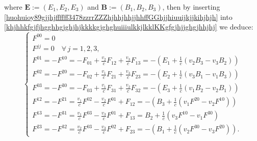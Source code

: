 \documentclass{article}
\theoremstyle{definition}
\theoremstyle{remark}
\renewcommand{\vec}[1]{\mathbf{#1}}
\newcommand{\er}{\eqref}
\newcommand{\er}{\eqref}
\begin{document}
where  $\vec E:=(E_1,E_2,E_3)$ and $\vec B:=(B_1,B_2,B_3)$, then by
inserting
\er{huohuioy89gjjhjffffff3478zzrrZZZhjhhjhhjjhhffGGhjjhiuuijkjjkihjhjh}
into
\er{khjhhkfgjfjhgghhgjghjhjkkkkgjghghuiiiulkkjlkklKKgfgjhjjghgjhhjhj}
we deduce:
\begin{equation}\label{khjhhkfgjfjhgghhgjghjhjkkkkgjghghuiiiulkkjlkklKKgfgjhjjghgjhhjhjhhhhh}
\begin{cases}
F^{00}=0
\\
F^{jj}=0 \quad\forall\, j=1,2,3,
\\
F^{01}=-F^{10}=-F_{01}+\frac{v_2}{c}F_{12}+\frac{v_3}{c}F_{13}=-\left(E_1+\frac{1}{c}\left(v_2B_3-v_3B_2\right)\right)\\
F^{02}=-F^{20}=-F_{02}+\frac{v_1}{c}F_{21}+\frac{v_3}{c}F_{23}=-\left(E_2+\frac{1}{c}\left(v_3B_1-v_1B_3\right)\right)\\
F^{03}=-F^{30}=-F_{03}+\frac{v_1}{c}F_{31}+\frac{v_2}{c}F_{32}=-\left(E_3+\frac{1}{c}\left(v_1B_2-v_2B_1\right)\right)
\\

F^{12}=-F^{21}=\frac{v_1}{c}F^{02}-\frac{v_2}{c}F^{01}+F_{12}=-\left(B_3+\frac{1}{c}\left(v_1F^{20}-v_2F^{10}\right)\right)\\
F^{13}=-F^{31}=\frac{v_1}{c}F^{03}-\frac{v_3}{c}F^{01}+F_{13}=B_2+\frac{1}{c}\left(v_3F^{10}-v_1F^{30}\right)\\
F^{23}=-F^{32}=\frac{v_2}{c}F^{03}-\frac{v_3}{c}F^{02}+F_{23}=-\left(B_1+\frac{1}{c}\left(v_2F^{30}-v_3F^{20}\right)\right).
\end{cases}
\end{equation}
\end{document}
